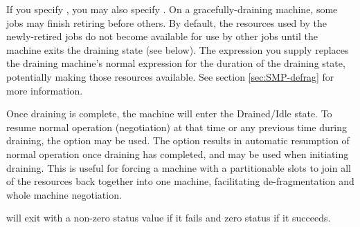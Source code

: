 \begin{ManPage}
\begin{description}
\end{description}

If you specify , you may also specify .  On a
gracefully-draining machine, some jobs may finish retiring before others.
By default, the resources used by the newly-retired jobs do not become
available for use by other jobs until the machine exits the draining state
(see below).  The  expression you supply replaces the draining
machine's normal  expression for the duration of the draining
state, potentially making those resources available.  See section
\ref{sec:SMP-defrag} for more information.

Once draining is complete, the machine will enter the Drained/Idle
state.  To resume normal operation (negotiation) at that time 
or any previous time during draining,
the  option may be used.  
The  option results in
automatic resumption of normal operation once draining has completed, 
and may be used when initiating draining.  
This is useful for forcing a machine with a partitionable
slots to join all of the resources back together into one machine,
facilitating de-fragmentation and whole machine negotiation.

\begin{Options}
  \ToolDebugDesc
\end{Options}

\ExitStatus

 will exit with a non-zero status value if it fails and
zero status if it succeeds.

\end{ManPage}
